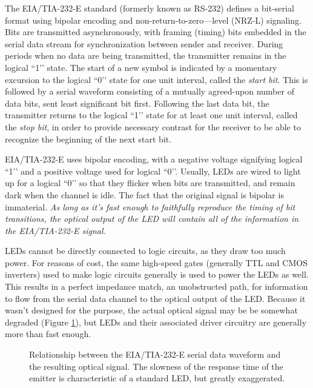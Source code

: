 \documentclass[twocolumn]{article}
\begin{document}
The EIA/TIA-232-E standard (formerly known as RS-232) defines a bit-serial format using bipolar encoding and non-return-to-zero---level (NRZ-L) signaling.  Bits are transmitted asynchronously, with framing (timing) bits embedded in the serial data stream for synchronization between sender and receiver.  During periods when no data are being transmitted, the transmitter remains in the logical ``1’’ state.  The start of a new symbol is indicated by a momentary excursion to the logical ``0’’ state for one unit interval, called the {\it start bit}.  This is followed by a serial waveform consisting of a mutually agreed-upon number of data bits, sent least significant bit first.  Following the last data bit, the transmitter returns to the logical ``1’’ state for at least one unit interval, called the {\it stop bit}, in order to provide necessary contrast for the receiver to be able to recognize the beginning of the next start bit. \cite{eia_tia_232_e}

EIA/TIA-232-E uses bipolar encoding, with a negative voltage signifying logical ``1’’ and a positive voltage used for logical ``0’’.  Usually, LEDs are wired to light up for a logical ``0’’ so that they flicker when bits are transmitted, and remain dark when the channel is idle.  The fact that the original signal is bipolar is immaterial.  {\it As long as it’s fast enough to faithfully reproduce the timing of bit transitions, the optical output of the LED will contain all of the information in the EIA/TIA-232-E signal.}

LEDs cannot be directly connected to logic circuits, as they draw too much power.  For reasons of cost, the same high-speed gates (generally TTL and CMOS inverters) used to make logic circuits generally is used to power the LEDs as well.  This results in a perfect impedance match, an unobstructed path, for information to flow from the serial data channel to the optical output of the LED.  Because it wasn’t designed for the purpose, the actual optical signal may be be somewhat degraded (Figure \ref{actual_led_response_figure}), but LEDs and their associated driver circuitry are generally more than fast enough.

\begin{figure}[htbp]
\centerline{\epsfysize=1.5in }
\caption{Relationship between the EIA/TIA-232-E serial data waveform
and the resulting optical signal.  The slowness of the response time
of the emitter is characteristic of a standard LED, but greatly
exaggerated.}
\label{actual_led_response_figure}
\end{figure}
\end{document}

